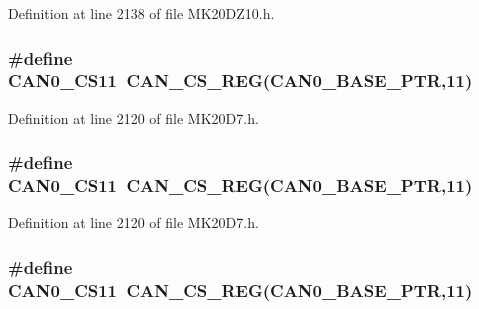 Definition at line 2138 of file M\+K20\+D\+Z10.\+h.

\subsubsection[{\texorpdfstring{C\+A\+N0\+\_\+\+C\+S11}{CAN0_CS11}}]{\setlength{\rightskip}{0pt plus 5cm}\#define C\+A\+N0\+\_\+\+C\+S11~{\bf C\+A\+N\+\_\+\+C\+S\+\_\+\+R\+EG}({\bf C\+A\+N0\+\_\+\+B\+A\+S\+E\+\_\+\+P\+TR},11)}\hypertarget{group___c_a_n___register___accessor___macros_ga561c5285f51c265d5a71fab22bd95ccd}{}\label{group___c_a_n___register___accessor___macros_ga561c5285f51c265d5a71fab22bd95ccd}


Definition at line 2120 of file M\+K20\+D7.\+h.

\subsubsection[{\texorpdfstring{C\+A\+N0\+\_\+\+C\+S11}{CAN0_CS11}}]{\setlength{\rightskip}{0pt plus 5cm}\#define C\+A\+N0\+\_\+\+C\+S11~{\bf C\+A\+N\+\_\+\+C\+S\+\_\+\+R\+EG}({\bf C\+A\+N0\+\_\+\+B\+A\+S\+E\+\_\+\+P\+TR},11)}\hypertarget{group___c_a_n___register___accessor___macros_ga561c5285f51c265d5a71fab22bd95ccd}{}\label{group___c_a_n___register___accessor___macros_ga561c5285f51c265d5a71fab22bd95ccd}


Definition at line 2120 of file M\+K20\+D7.\+h.

\subsubsection[{\texorpdfstring{C\+A\+N0\+\_\+\+C\+S11}{CAN0_CS11}}]{\setlength{\rightskip}{0pt plus 5cm}\#define C\+A\+N0\+\_\+\+C\+S11~{\bf C\+A\+N\+\_\+\+C\+S\+\_\+\+R\+EG}({\bf C\+A\+N0\+\_\+\+B\+A\+S\+E\+\_\+\+P\+TR},11)}\hypertarget{group___c_a_n___register___accessor___macros_ga561c5285f51c265d5a71fab22bd95ccd}{}\label{group___c_a_n___register___accessor___macros_ga561c5285f51c265d5a71fab22bd95ccd}


